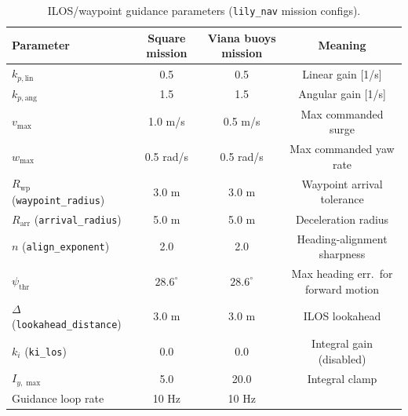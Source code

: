 \begin{table}[H]
\centering
\caption{ILOS/waypoint guidance parameters (\texttt{lily\_nav} mission configs).}
\label{tab:ilosparams}
\begin{tabular}{@{}lccc@{}}
\toprule
Parameter & Square mission & Viana buoys mission & Meaning\\
\midrule
$k_{p,\text{lin}}$ & 0.5 & 0.5 & Linear gain [1/s]\\
$k_{p,\text{ang}}$ & 1.5 & 1.5 & Angular gain [1/s]\\
$v_{\max}$ & 1.0 m/s & 0.5 m/s & Max commanded surge \\
$w_{\max}$ & 0.5 rad/s & 0.5 rad/s & Max commanded yaw rate\\
$R_{\text{wp}}$ (\texttt{waypoint\_radius}) & 3.0 m & 3.0 m & Waypoint arrival tolerance\\
$R_{\text{arr}}$ (\texttt{arrival\_radius}) & 5.0 m & 5.0 m & Deceleration radius\\
$n$ (\texttt{align\_exponent}) & 2.0 & 2.0 & Heading-alignment sharpness\\
$\psi_{\text{thr}}$ & $28.6^\circ$ & $28.6^\circ$ & Max heading err.\ for forward motion\\
$\Delta$ (\texttt{lookahead\_distance}) & 3.0 m & 3.0 m & ILOS lookahead \\
$k_i$ (\texttt{ki\_los}) & 0.0 & 0.0 & Integral gain (disabled)\\
$I_{y,\max}$ & 5.0 & 20.0 & Integral clamp \\
Guidance loop rate & 10 Hz & 10 Hz & \\
\bottomrule
\end{tabular}
\end{table}


